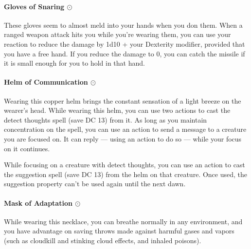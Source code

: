     \paragraph{Gloves of Snaring $\odot$}
        These gloves seem to almost meld into your hands when you don them.
        When a ranged weapon attack hits you while you're wearing them, you can use your reaction to reduce the damage by 1d10 + your Dexterity modifier, provided that you have a free hand.
        If you reduce the damage to 0, you can catch the missile if it is small enough for you to hold in that hand.
    \paragraph{Helm of Communication $\odot$}
        Wearing this copper helm brings the constant sensation of a light breeze on the wearer's head.
        While wearing this helm, you can use two actions to cast the detect thoughts spell (save DC 13) from it.
        As long as you maintain concentration on the spell, you can use an action to send a message to a creature you are focused on.
        It can reply --- using an action to do so --- while your focus on it continues.

        While focusing on a creature with detect thoughts, you can use an action to cast the suggestion spell (save DC 13) from the helm on that creature.
        Once used, the suggestion property can't be used again until the next dawn.
    \paragraph{Mask of Adaptation $\odot$}
        While wearing this necklace, you can breathe normally in any environment, and you have advantage on saving throws made against harmful gases and vapors (such as cloudkill and stinking cloud effects, and inhaled poisons).
